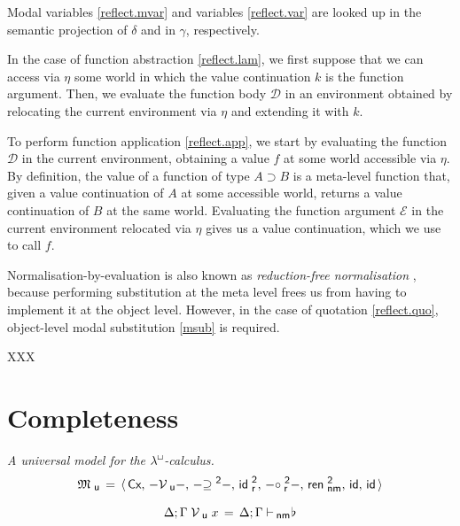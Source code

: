 \documentclass{entcs}
\numberwithin{equation}{thm}
\newcommand{\lambdabox}{\lambda^{\mkern-1mu\sq\mkern-2mu}}
\newcommand{\binop}[1]{-\mathord{#1}-}
\newcommand{\tsf}[1]{\textsf{\upshape{#1}}}
\newcommand{\stsf}[1]{\tsf{\small{#1}}}
\renewcommand{\:}{\mathrel{:}}
\newcommand{\id}{\operatorname{\tsf{id}}}
\newcommand{\0}{\varnothing}
\newcommand{\geqZ}{\mathrel{\supseteq^{\stsf{2}}}}
\newcommand{\ideZ}{\operatorname{\tsf{id}_{\stsf{r}}^{\stsf{2}}}}
\newcommand{\compeZ}{\mathrel{\circ_{\mkern-1mu\stsf{r}}^{\stsf{2}}}}
\newcommand{\base}{\flat}
\newcommand{\imp}{\mathbin{\supset}}
\newcommand{\sq}{\Box}
\newcommand{\Cx}{\tsf{Cx}}
\newcommand{\D}{\mathcal{D}}
\newcommand{\E}{\mathcal{E}}
\newcommand{\enm}{\mathrel{\vdash_{\mkern-2mu\stsf{nm}}}}
\newcommand{\rennmZ}{\operatorname{\tsf{ren}_{\stsf{nm}}^{\stsf{2}}}}
\newcommand{\Mu}{\mathfrak{M}_{\stsf{u}}}
\newcommand{\Vu}{\mathrel{\mathcal{V}_{\stsf{u}}}}
\begin{document}
Modal variables \eqref{reflect.mvar} and variables \eqref{reflect.var} are looked up in the semantic projection of $\delta$ and in $\gamma$, respectively.

In the case of function abstraction \eqref{reflect.lam}, we first suppose that we can access via $\eta$ some world in which the value continuation $k$ is the function argument.  Then, we evaluate the function body $\D$ in an environment obtained by relocating the current environment via $\eta$ and extending it with $k$.

To perform function application \eqref{reflect.app}, we start by evaluating the function $\D$ in the current environment, obtaining a value $f$ at some world accessible via $\eta$.  By definition, the value of a function of type $A \imp B$ is a meta-level function that, given a value continuation of $A$ at some accessible world, returns a value continuation of $B$ at the same world.  Evaluating the function argument $\E$ in the current environment relocated via $\eta$ gives us a value continuation, which we use to call $f$.

Normalisation-by-evaluation is also known as \emph{reduction-free normalisation} \cite{AltenkirchHS1995,Danvy2005}, because performing substitution at the meta level frees us from having to implement it at the object level.  However, in the case of quotation \eqref{reflect.quo}, object-level modal substitution \eqref{msub} is required.

XXX

\lipsum[1]


\section{Completeness}

\begin{definition}
  \label{Mu}
  \emph{A universal model for the $\lambdabox$-calculus.}
  \begin{gather*}
    \Mu \,=\, \langle\,\Cx,\,\binop{\Vu},\,\binop{\geqZ},\,\ideZ,\,\binop{\compeZ},\,\rennmZ,\,\id,\,\id\,\rangle\\[0.5\baselineskip]
    \Delta; \Gamma \Vu x \,=\, \Delta; \Gamma \enm \mkern-4mu \base
  \end{gather*}
\end{definition}
\end{document}
